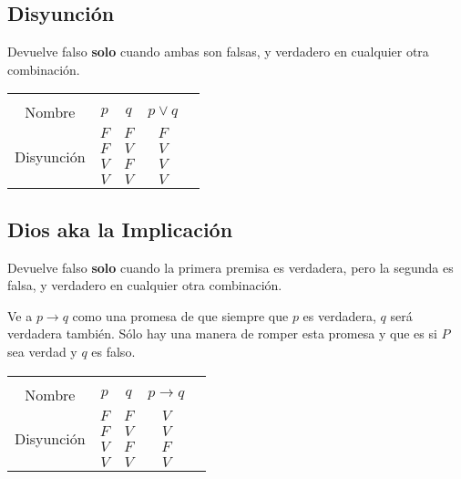 \documentclass[12pt, fleqn]{report}                             %
\begin{document}
            \subsection{Disyunción}

                Devuelve falso \textbf{solo} cuando ambas son falsas, y verdadero en cualquier
                otra combinación.\\

                \begin{tabular}{ |c|c|c|c|c| } 
                    \hline &&&\\
                    \large{Nombre} & $p$ & $q$ & $p \lor q$ \\[0.5em]
                    \hline
                    \multirow{4}{5em}{Disyunción}
                    & $F$ & $F$ & $F$ \\ \cline{2-4}
                    & $F$ & $V$ & $V$ \\ \cline{2-4}
                    & $V$ & $F$ & $V$ \\ \cline{2-4}
                    & $V$ & $V$ & $V$ \\ 
                    \hline
                \end{tabular}





            \clearpage
            \subsection{Dios aka la Implicación}

                Devuelve falso \textbf{solo} cuando la primera premisa es verdadera, pero la 
                segunda es falsa, y verdadero en cualquier otra combinación.

                Ve a $p \to q$ como una promesa de que siempre que $p$ es verdadera, $q$ será verdadera también.
                Sólo hay una manera de romper esta promesa y que es si $P$ sea verdad y $q$ es falso.\\


                \begin{tabular}{ |c|c|c|c|c| } 
                    \hline &&&\\
                    \large{Nombre} & $p$ & $q$ & $p \to q$ \\[0.5em]
                    \hline
                    \multirow{4}{5em}{Disyunción}
                    & $F$ & $F$ & $V$ \\ \cline{2-4}
                    & $F$ & $V$ & $V$ \\ \cline{2-4}
                    & $V$ & $F$ & $F$ \\ \cline{2-4}
                    & $V$ & $V$ & $V$ \\ 
                    \hline
                \end{tabular}\\[1.0em]
\end{document}

